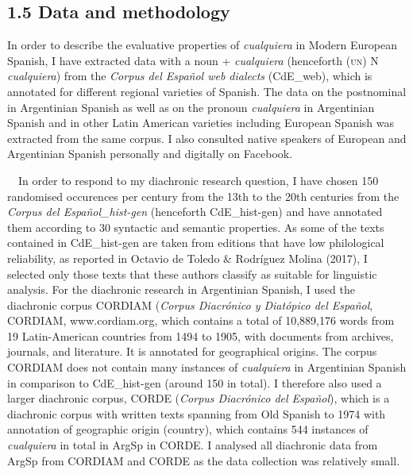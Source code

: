 \subsection[1.5 Data and methodology]{1.5 Data and methodology}
\begin{styleStandard}
In order to describe the evaluative properties of \textit{cualquiera} in Modern European Spanish, I have extracted data with a noun +\textit{ cualquiera} (henceforth (\textsc{un)} N \textit{cualquiera}) from the \textit{Corpus del Español web dialects} (CdE\_web), which is annotated for different regional varieties of Spanish. The data on the postnominal in Argentinian Spanish as well as on the pronoun \textit{cualquiera} in Argentinian Spanish and in other Latin American varieties including European Spanish was extracted from the same corpus. I also consulted native speakers of European and Argentinian Spanish personally and digitally on Facebook.
\end{styleStandard}

\begin{styleStandard}
\ \ In order to respond to my diachronic research question, I have chosen 150 randomised occurences per century from the 13th to the 20th centuries from the \textit{Corpus del Español\_hist-gen} (henceforth CdE\_hist-gen) and have annotated them according to 30 syntactic and semantic properties. As some of the texts contained in CdE\_hist-gen are taken from editions that have low philological reliability, as reported in Octavio de Toledo \& Rodríguez Molina (2017), I selected only those texts that these authors classify as suitable for linguistic analysis. For the diachronic research in Argentinian Spanish, I used the diachronic corpus CORDIAM (\textit{Corpus Diacrónico y Diatópico del Español}, CORDIAM, www.cordiam.org, which contains a total of 10,889,176 words from 19 Latin-American countries from 1494 to 1905, with documents from archives, journals, and literature. It is annotated for geographical origins. The corpus CORDIAM does not contain many instances of \textit{cualquiera} in Argentinian Spanish in comparison to CdE\_hist-gen (around 150 in total). I therefore also used a larger diachronic corpus, CORDE (\textit{Corpus Diacrónico del Español}), which is a diachronic corpus with written texts spanning from Old Spanish to 1974 with annotation of geographic origin (country), which contains 544 instances of \textit{cualquiera} in total in ArgSp in CORDE. I analysed all diachronic data from ArgSp from CORDIAM and CORDE as the data collection was relatively small. 
\end{styleStandard}

